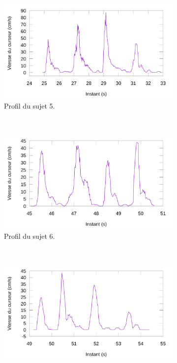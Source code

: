 	\begin{figure}[!htb]
		\centering
		\begin{subfigure}[t]{\subImgWlineplot}
			\centering
			\includegraphics[width=\textwidth]{figures/ch4/subject_05_static_condition_smoothed}
			\caption{Profil du sujet 5.}
			\label{fig:staticProfile5}
		\end{subfigure}
		~
		\begin{subfigure}[t]{\subImgWlineplot}
			\centering
			\includegraphics[width=\textwidth]{figures/ch4/subject_06_static_condition_smoothed}
			\caption{Profil du sujet 6.}
			\label{fig:staticProfile6}
		\end{subfigure}
		~
		\begin{subfigure}[t]{\subImgWlineplot}
			\centering
			\includegraphics[width=\textwidth]{figures/ch4/subject_08_static_condition_smoothed}

\end{subfigure}
\end{figure}
